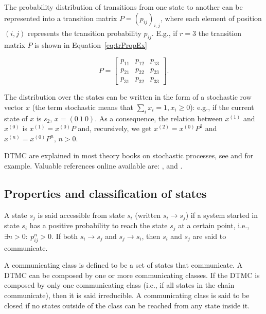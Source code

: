 \documentclass[nojss]{jss}
\begin{document}
The probability distribution of transitions from one state to another
can be represented into a transition matrix $P=(p_{ij})_{i,j}$, where each element
of position $(i,j)$ represents the transition probability $p_{ij}$. E.g., if
$r=3$ the transition matrix $P$ is shown in Equation~\ref{eq:trPropEx}

\begin{equation}
P=\left[\begin{array}{ccc}
p_{11} & p_{12} & p_{13}\\
p_{21} & p_{22} & p_{23}\\
p_{31} & p_{32} & p_{33}
\end{array}\right].
\label{eq:trPropEx}
\end{equation}


The distribution over the states can be written in the form of a stochastic row
vector $x$ (the term stochastic means that $\sum_{i}x_{i}=1, x_{i} \geq 0$): e.g., if the current state of $x$ is $s_{2}$, $x=\left(0\:1\:0\right)$.
As a consequence, the relation between $x^{(1)}$ and $x^{(0)}$
is $x^{(1)}=x^{(0)}P$ and, recursively, we get $x^{(2)}=x^{(0)}P^{2}$ and
$x^{(n)}=x^{(0)}P^{n},\, n>0$.

DTMC are explained in most theory books on stochastic processes, see \cite{bremaud1999discrete} and \cite{ching2006markov} for example. Valuable references online available are: \cite{konstantopoulos2009markov}, \cite{probBook} and \cite{bardPpt}.


\subsection{Properties and classification of states}\label{sec:properties}

A state $s_{j}$ is said accessible from state $s_{i}$ (written $s_{i}\rightarrow s_{j}$) if a system started in state $s_{i}$ has
a positive probability to reach the state $s_{j}$ at a certain
point, i.e., $\exists n>0:\: p_{ij}^{n}>0$. If both $s_{i}\rightarrow s_{j}$ and $s_{j}\rightarrow s_{i}$, then
$s_{i}$ and $s_{j}$ are said to communicate.

A communicating class is defined to be a set of states that communicate. 
A DTMC can be composed by one or more communicating classes.  If the DTMC is
composed by only one communicating class (i.e., if all states in the chain communicate), then
it is said irreducible. A communicating class is said to be closed if no states outside of the class can be reached from any state inside it.
\end{document}
